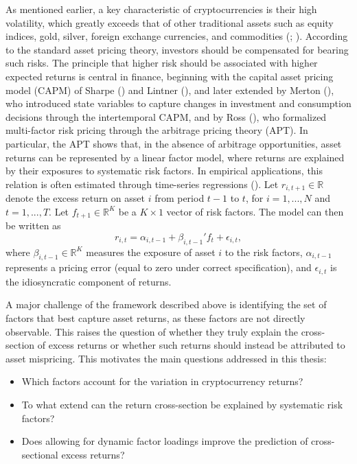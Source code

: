 \documentclass[
  12pt,
  a4paper,
  openany]{scrbook}
\providecommand{\tightlist}{%
  \setlength{\itemsep}{0pt}\setlength{\parskip}{0pt}}\usepackage{longtable,booktabs,array}
\begin{document}
As mentioned earlier, a key characteristic of cryptocurrencies is their
high volatility, which greatly exceeds that of other traditional assets
such as equity indices, gold, silver, foreign exchange currencies, and
commodities (; ).
According to the standard asset pricing theory, investors should be
compensated for bearing such risks. The principle that higher risk
should be associated with higher expected returns is central in finance,
beginning with the capital asset pricing model (CAPM) of Sharpe
() and Lintner
(), and later extended by
Merton (), who
introduced state variables to capture changes in investment and
consumption decisions through the intertemporal CAPM, and by Ross
(), who formalized
multi-factor risk pricing through the arbitrage pricing theory (APT). In
particular, the APT shows that, in the absence of arbitrage
opportunities, asset returns can be represented by a linear factor
model, where returns are explained by their exposures to systematic risk
factors. In empirical applications, this relation is often estimated
through time-series regressions
(). Let
\(r_{i,t+1} \in \mathbb{R}\) denote the excess return on asset \(i\)
from period \(t-1\) to \(t\), for \(i = 1, ..., N\) and
\(t = 1, ..., T\). Let \(f_{t+1} \in \mathbb{R}^K\) be a \(K \times 1\)
vector of risk factors. The model can then be written as\\
\[
r_{i,t} = \alpha_{i,t-1} + \beta_{i,t-1}' f_{t} + \epsilon_{i,t},
\] where \(\beta_{i,t-1} \in \mathbb{R}^K\) measures the exposure of
asset \(i\) to the risk factors, \(\alpha_{i,t-1}\) represents a pricing
error (equal to zero under correct specification), and
\(\epsilon_{i,t}\) is the idiosyncratic component of returns.

A major challenge of the framework described above is identifying the
set of factors that best capture asset returns, as these factors are not
directly observable. This raises the question of whether they truly
explain the cross-section of excess returns or whether such returns
should instead be attributed to asset mispricing. This motivates the
main questions addressed in this thesis:

\begin{itemize}
\tightlist
\item
  Which factors account for the variation in cryptocurrency returns?
\item
  To what extend can the return cross-section be explained by systematic
  risk factors?
\item
  Does allowing for dynamic factor loadings improve the prediction of
  cross-sectional excess returns?
\end{itemize}
\end{document}

